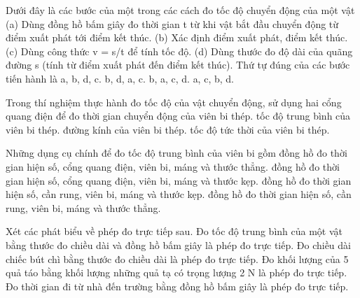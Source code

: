 \begin{ex}
Dưới đây là các bước của một trong các cách đo tốc độ chuyển động của một vật
(a) Dùng đồng hồ bấm giây đo thời gian t từ khi vật bắt đầu chuyển động từ điểm xuất phát tới điểm kết thúc.
(b) Xác định điểm xuất phát, điểm kết thúc.
(c) Dùng công thức v = s/t để tính tốc độ.
(d) Dùng thước đo độ dài của quãng đường s (tính từ điểm xuất phát đến điểm kết thúc).
Thứ tự đúng của các bước tiến hành là
\choice
{a, b, d, c.}
{\True b, d, a, c.}
{b, a, c, d.}
{a, c, b, d.}
\end{ex}

\begin{ex}
Trong thí nghiệm thực hành đo tốc độ của vật chuyển động, sử dụng hai cổng quang điện để đo
\choice
{\True thời gian chuyển động của viên bi thép.}
{tốc độ trung bình của viên bi thép.}
{đường kính của viên bi thép.}
{tốc độ tức thời của viên bi thép.}
\end{ex}

\begin{ex}
Những dụng cụ chính để đo tốc độ trung bình của viên bi gồm
\choice
{\True đồng hồ đo thời gian hiện số, cổng quang điện, viên bi, máng và thước thẳng.}
{đồng hồ đo thời gian hiện số, cổng quang điện, viên bi, máng và thước kẹp.}
{đồng hồ đo thời gian hiện số, cần rung, viên bi, máng và thước kẹp.}
{đồng hồ đo thời gian hiện số, cần rung, viên bi, máng và thước thẳng.}
\end{ex}
\begin{ex}
Xét các phát biểu về phép đo trực tiếp sau.
\choiceTF
{Đo tốc độ trung bình của một vật bằng thước đo chiều dài và đồng hồ bấm giây là phép đo trực tiếp.}
{\True Đo chiều dài chiếc bút chì bằng thước đo chiều dài là phép đo trực tiếp.}
{Đo khối lượng của 5 quả táo bằng khối lượng những quả tạ có trọng lượng 2 N là phép đo trực tiếp.}
{\True Đo thời gian đi từ nhà đến trường bằng đồng hồ bấm giây là phép đo trực tiếp.}
\end{ex}

